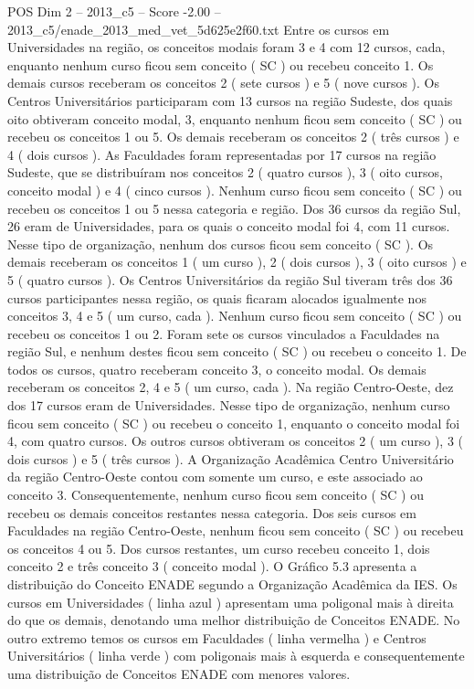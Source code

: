 \begin{textsample}{POS Dim 2 – 2013\_c5 – Score -2.00 – 2013\_c5/enade\_2013\_med\_vet\_5d625e2f60.txt}
Entre os cursos em Universidades na região, os conceitos modais foram 3 e 4 com 12 cursos, cada, enquanto nenhum curso ficou sem conceito ( SC ) ou recebeu conceito 1.
Os demais cursos receberam os conceitos 2 ( sete cursos ) e 5 ( nove cursos ).
Os Centros Universitários participaram com 13 cursos na região Sudeste, dos quais oito obtiveram conceito modal, 3, enquanto nenhum ficou sem conceito ( SC ) ou recebeu os conceitos 1 ou 5.
Os demais receberam os conceitos 2 ( três cursos ) e 4 ( dois cursos ).
As Faculdades foram representadas por 17 cursos na região Sudeste, que se distribuíram nos conceitos 2 ( quatro cursos ), 3 ( oito cursos, conceito modal ) e 4 ( cinco cursos ).
Nenhum curso ficou sem conceito ( SC ) ou recebeu os conceitos 1 ou 5 nessa categoria e região.
Dos 36 cursos da região Sul, 26 eram de Universidades, para os quais o conceito modal foi 4, com 11 cursos.
Nesse tipo de organização, nenhum dos cursos ficou sem conceito ( SC ).
Os demais receberam os conceitos 1 ( um curso ), 2 ( dois cursos ), 3 ( oito cursos ) e 5 ( quatro cursos ).
Os Centros Universitários da região Sul tiveram três dos 36 cursos participantes nessa região, os quais ficaram alocados igualmente nos conceitos 3, 4 e 5 ( um curso, cada ).
Nenhum curso ficou sem conceito ( SC ) ou recebeu os conceitos 1 ou 2.
Foram sete os cursos vinculados a Faculdades na região Sul, e nenhum destes ficou sem conceito ( SC ) ou recebeu o conceito 1.
De todos os cursos, quatro receberam conceito 3, o conceito modal.
Os demais receberam os conceitos 2, 4 e 5 ( um curso, cada ).
Na região Centro-Oeste, dez dos 17 cursos eram de Universidades.
Nesse tipo de organização, nenhum curso ficou sem conceito ( SC ) ou recebeu o conceito 1, enquanto o conceito modal foi 4, com quatro cursos.
Os outros cursos obtiveram os conceitos 2 ( um curso ), 3 ( dois cursos ) e 5 ( três cursos ).
A Organização Acadêmica Centro Universitário da região Centro-Oeste contou com somente um curso, e este associado ao conceito 3.
Consequentemente, nenhum curso ficou sem conceito ( SC ) ou recebeu os demais conceitos restantes nessa categoria.
Dos seis cursos em Faculdades na região Centro-Oeste, nenhum ficou sem conceito ( SC ) ou recebeu os conceitos 4 ou 5.
Dos cursos restantes, um curso recebeu conceito 1, dois conceito 2 e três conceito 3 ( conceito modal ).
O Gráfico 5.3 apresenta a distribuição do Conceito ENADE segundo a Organização Acadêmica da IES.
Os cursos em Universidades ( linha azul ) apresentam uma poligonal mais à direita do que os demais, denotando uma melhor distribuição de Conceitos ENADE.
No outro extremo temos os cursos em Faculdades ( linha vermelha ) e Centros Universitários ( linha verde ) com poligonais mais à esquerda e consequentemente uma distribuição de Conceitos ENADE com menores valores.

\end{textsample}
